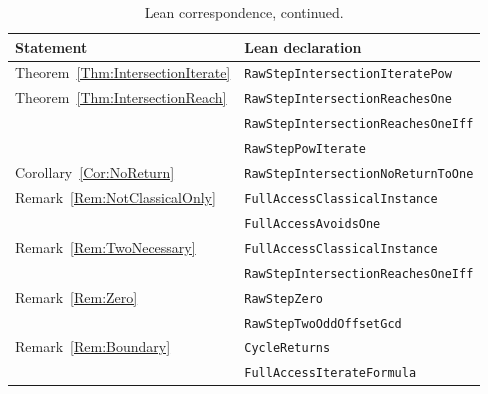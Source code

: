 \documentclass[11pt,letterpaper]{article}
\begin{document}
\begin{table}[htbp]
\centering
\begin{tabular}{ll}
\toprule
Statement & Lean declaration \\
\midrule
Theorem~\ref{Thm:IntersectionIterate} & \texttt{RawStepIntersectionIteratePow} \\
Theorem~\ref{Thm:IntersectionReach} & \texttt{RawStepIntersectionReachesOne} \\
 & \texttt{RawStepIntersectionReachesOneIff} \\
 & \texttt{RawStepPowIterate} \\
Corollary~\ref{Cor:NoReturn} & \texttt{RawStepIntersectionNoReturnToOne} \\
Remark~\ref{Rem:NotClassicalOnly} & \texttt{FullAccessClassicalInstance} \\
 & \texttt{FullAccessAvoidsOne} \\
Remark~\ref{Rem:TwoNecessary} & \texttt{FullAccessClassicalInstance} \\
 & \texttt{RawStepIntersectionReachesOneIff} \\
Remark~\ref{Rem:Zero} & \texttt{RawStepZero} \\
 & \texttt{RawStepTwoOddOffsetGcd} \\
Remark~\ref{Rem:Boundary} & \texttt{CycleReturns} \\
 & \texttt{FullAccessIterateFormula} \\
\bottomrule
\end{tabular}
\caption{Lean correspondence, continued.}
\end{table}
\end{document}
